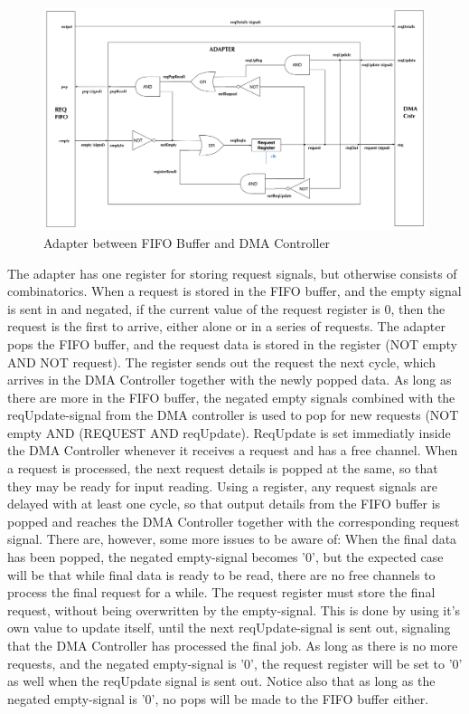 \begin{appendix}
\begin{figure}[h!]
    \centering
    \includegraphics[width=1.0\textwidth]{Figures/DMA/Adapter}
    \caption{Adapter between FIFO Buffer and DMA Controller}
    \label{fig:adapter}
\end{figure}

The adapter has one register for storing request signals, but otherwise consists of combinatorics.
When a request is stored in the FIFO buffer, and the empty signal is sent in and negated, if the current value of the request register is 0, then the request is the first to arrive, either alone or in a series of requests.
The adapter pops the FIFO buffer, and the request data is stored in the register (NOT empty AND NOT request).
The register sends out the request the next cycle, which arrives in the DMA Controller together with the newly popped data.
As long as there are more in the FIFO buffer, the negated empty signals combined with the reqUpdate-signal from the DMA controller is used to pop for new requests (NOT empty AND (REQUEST AND reqUpdate).
ReqUpdate is set immediatly inside the DMA Controller whenever it receives a request and has a free channel.
When a request is processed, the next request details is popped at the same, so that they may be ready for input reading.
Using a register, any request signals are delayed with at least one cycle, so that output details from the FIFO buffer is popped and reaches the DMA Controller together with the corresponding request signal.
There are, however, some more issues to be aware of:
When the final data has been popped, the negated empty-signal becomes '0', but the expected case will be that while final data is ready to be read, there are no free channels to process the final request for a while.
The request register must store the final request, without being overwritten by the empty-signal.
This is done by using it's own value to update itself, until the next reqUpdate-signal is sent out, signaling that the DMA Controller has processed the final job.
As long as there is no more requests, and the negated empty-signal is '0', the request register will be set to '0' as well when the reqUpdate signal is sent out.
Notice also that as long as the negated empty-signal is '0', no pops will be made to the FIFO buffer either. 


\end{appendix}
